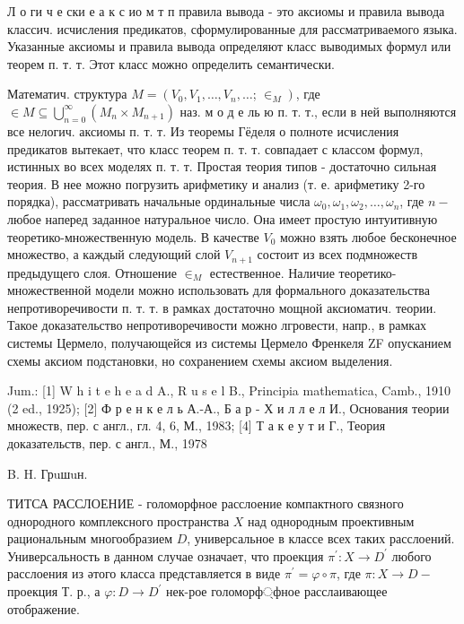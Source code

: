 \documentclass[10pt]{article}
\begin{document}
Л о ги ч е ски е а к с ио м т п правила вывода - это аксиомы и правила вывода классич. исчисления предикатов, сформулированные для рассматриваемого языка. Указанные аксиомы и правила вывода определяют класс выводимых формул или теорем п. т. т. Этот класс можно определить семантически.



Математич. структура $M=\left(V_{0}, V_{1}, \ldots, V_{n}, \ldots\right.$; $\left.\in_{M}\right)$, где $\in M \subseteq \bigcup_{n=0}^{\infty}\left(M_{n} \times M_{n+1}\right)$ наз. м о д е ль ю п. т. т., если в ней выполняются все нелогич. аксиомы п. т. т. Из теоремы Гёделя о полноте исчисления предикатов вытекает, что класс теорем п. т. т. совпадает с классом формул, истинных во всех моделях п. т. т. Простая теория типов - достаточно сильная теория. В нее можно погрузить арифметику и анализ (т. е. арифметику 2-го порядка), рассматривать начальные ординальные числа $\omega_{0}, \omega_{1}, \omega_{2}, \ldots, \omega_{n}$, где $n-$ любое наперед заданное натуральное число. Она имеет простую интуитивную теоретико-множественную модель. В качестве $V_{0}$ можно взять любое бесконечное множество, а каждый следующий слой $V_{n+1}$ состоит из всех подмножеств предыдущего слоя. Отношение $\in_{M}$ естественное. Наличие теоретико-множественной модели можно использовать для формального доказательства непротиворечивости п. т. т. в рамках достаточно мощной аксиоматич. теории. Такое доказательство непротиворечивости можно лгровести, напр., в рамках системы Цермело, получающейся из системы Цермело Френкеля ZF опусканием схемы аксиом подстановки, но сохранением схемы аксиом выделения.



Jum.: [1] W h i t e h e a d A., R u s e l B., Principia mathematica, Camb., 1910 (2 ed., 1925); [2] Ф р е н к е л ь А.-А., Б а р - Х и л л е л И., Основания теории множеств, пер. с англ., гл. 4, 6, М., 1983; [4] Т а к е у т и Г., Теория доказательств, пер. с англ., М., 1978



B. H. Грuшuн.



ТИТСА РАССЛОЕНИЕ - голоморфное расслоение компактного связного однородного комплексного пространства $X$ над однородным проективным рациональным многообразием $D$, универсальное в классе всех таких расслоений. Универсальность в данном случае означает, что проекция $\pi^{\prime}: X \rightarrow D^{\prime}$ любого расслоения из әтого класса представляется в виде $\pi^{\prime}=\varphi \circ \pi$, где $\pi: X \rightarrow D-$ проекция Т. р., а $\varphi: D \rightarrow D^{\prime}$ нек-рое голоморф্фное расслаивающее отображение.
\end{document}
